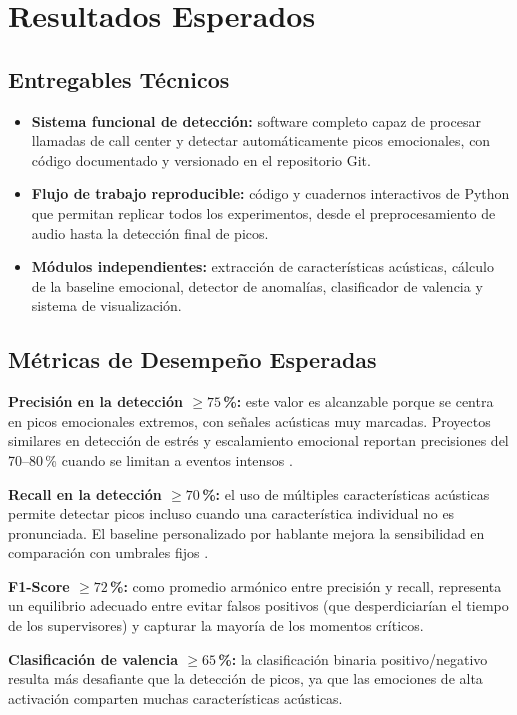 \section{Resultados Esperados}

\subsection{Entregables Técnicos}

\begin{itemize}
    \item \textbf{Sistema funcional de detección:} software completo capaz de procesar
          llamadas de call center y detectar automáticamente picos emocionales, con
          código documentado y versionado en el repositorio Git.
    \item \textbf{Flujo de trabajo reproducible:} código y cuadernos interactivos de
          Python que permitan replicar todos los experimentos, desde el
          preprocesamiento de audio hasta la detección final de picos.
    \item \textbf{Módulos independientes:} extracción de características acústicas,
          cálculo de la baseline emocional, detector de anomalías, clasificador de
          valencia y sistema de visualización.
\end{itemize}

\subsection{Métricas de Desempeño Esperadas}

\textbf{Precisión en la detección $\geq 75$\,\%:} este valor es alcanzable porque se
centra en picos emocionales extremos, con señales acústicas muy marcadas. Proyectos
similares en detección de estrés y escalamiento emocional reportan precisiones del
70--80\,\% cuando se limitan a eventos intensos \cite{abdelhamid2022, wagner2023}.

\textbf{Recall en la detección $\geq 70$\,\%:} el uso de múltiples características
acústicas permite detectar picos incluso cuando una característica individual no es
pronunciada. El baseline personalizado por hablante mejora la sensibilidad en
comparación con umbrales fijos \cite{jha2022, gat2022}.

\textbf{F1-Score $\geq 72$\,\%:} como promedio armónico entre precisión y recall,
representa un equilibrio adecuado entre evitar falsos positivos (que desperdiciarían
el tiempo de los supervisores) y capturar la mayoría de los momentos críticos.

\textbf{Clasificación de valencia $\geq 65$\,\%:} la clasificación binaria
positivo/negativo resulta más desafiante que la detección de picos, ya que las
emociones de alta activación comparten muchas características acústicas.
